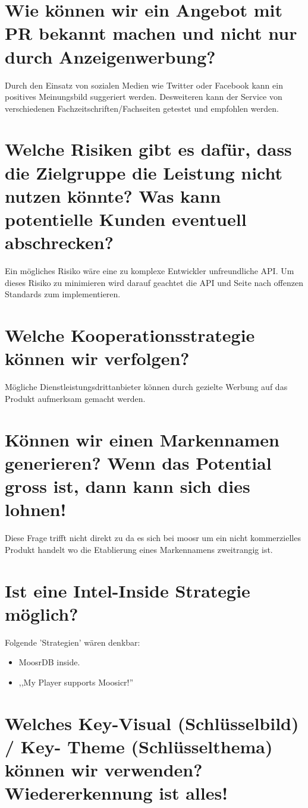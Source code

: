 \documentclass[11pt]{scrreprt}
\begin{document}
\section{Wie können wir ein Angebot mit PR bekannt
    machen und nicht nur durch
Anzeigenwerbung?}

Durch den Einsatz von sozialen Medien wie Twitter oder Facebook kann ein
positives Meinungsbild suggeriert werden. Desweiteren kann der Service von
verschiedenen Fachzeitschriften/Fachseiten getestet und empfohlen werden.


\section{Welche Risiken gibt es dafür, dass die Zielgruppe
    die Leistung nicht nutzen könnte?
    Was kann potentielle Kunden eventuell
abschrecken?}
Ein mögliches Risiko wäre eine zu komplexe Entwickler unfreundliche API. Um
dieses Risiko zu minimieren wird darauf geachtet die API und Seite nach offenzen
Standards zum implementieren.

\section{Welche Kooperationsstrategie können wir
verfolgen?}
Mögliche Dienstleistungsdrittanbieter können durch gezielte Werbung auf das
Produkt aufmerksam gemacht werden.


\label{Markenname}\section{Können wir einen Markennamen generieren?
    Wenn das Potential gross ist, dann kann sich
dies lohnen!}
Diese Frage trifft nicht direkt zu da es sich bei moosr um ein
nicht kommerzielles Produkt handelt wo die Etablierung eines Markennamens
zweitrangig ist. 

\section{Ist eine Intel-Inside Strategie möglich?}
Folgende 'Strategien' wären denkbar:
\begin{itemize}
    \item MoosrDB inside.
    \item ,,My Player supports Moosicr!''
\end{itemize}


\section{Welches Key-Visual (Schlüsselbild) / Key-
    Theme (Schlüsselthema) können wir
verwenden? Wiedererkennung ist alles!}
\end{document}
